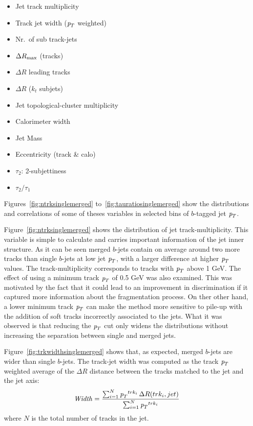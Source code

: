 \begin{itemize}\addtolength{\itemsep}{-0.4\baselineskip}
\item
Jet track multiplicity
\item
Track jet width (${\emph{p}_{T}}$ weighted)
\item
Nr.\ of sub track-jets
\item
$\Delta R_{\rm max}$ (tracks)
\item
$\Delta R$ leading tracks
\item
$\Delta R$ ($k_t$ subjets)
\item
Jet topological-cluster multiplicity
\item
Calorimeter width
\item 
Jet Mass
\item 
Eccentricity (track \& calo)
\item
$\tau_2$: 2-subjettiness 
\item
$\tau_2/\tau_1$
\end{itemize}




Figures~\ref{fig:ntrksinglemerged} to~\ref{fig:tauratiosinglemerged} show the distributions and correlations of some of theses variables in selected bins of $b$-tagged jet ${\emph{p}_{T}}$.

Figure~\ref{fig:ntrksinglemerged} shows the distribution of jet track-multiplicity. This variable is simple to calculate and carries important information of the jet inner structure. As it can be seen merged $b$-jets contain on average around two more tracks than single $b$-jets at low jet ${\emph{p}_{T}}$, with a larger difference at higher ${\emph{p}_{T}}$ values. The track-multiplicity corresponds to tracks with ${\emph{p}_{T}}$ above 1 GeV. The effect of using a minimum track ${\emph{p}_{T}}$ of 0.5 GeV was also examined. This was motivated by the fact that it could lead to an improvement in discrimination if it captured more information about the fragmentation process.  On ther other hand, a lower minimum track ${\emph{p}_{T}}$ can make the method more sensitive to pile-up with the addition of soft tracks incorrectly associated to the jets.  What it was observed is that reducing the ${\emph{p}_{T}}$ cut only widens the distributions without increasing the separation between single and merged jets. 

Figure~\ref{fig:trkwidthsinglemerged} shows that, as expected, merged $b$-jets are wider than single $b$-jets. The track-jet width was computed as the track ${\emph{p}_{T}}$ weighted average of the $\Delta R$ distance between the tracks matched to the jet and the jet axis:
\begin{equation*} 
{\it Width} = \frac{\sum_{i=1}^N {\emph{p}_{T}}^{trk_i} \,\Delta R (trk_i,jet) }{\sum_{i=1}^N {\emph{p}_{T}}^{trk_i} }
\end{equation*} 
where $N$ is the total number of tracks in the jet.


